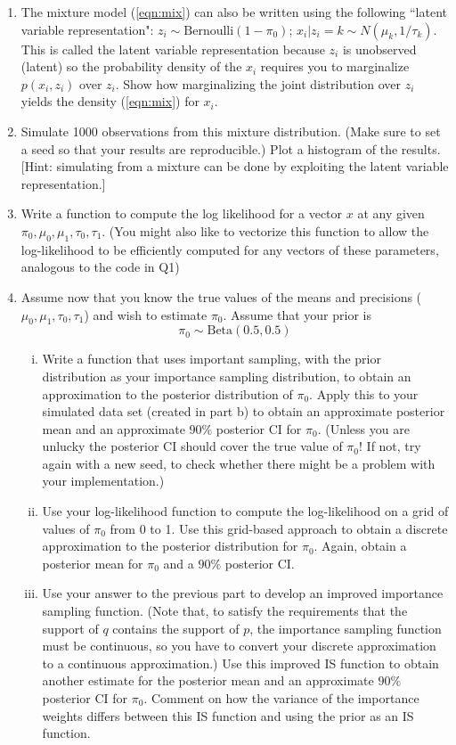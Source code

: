 \documentclass[12pt]{article}
\def\Be{\mbox{Beta}}
\begin{document}
\begin{enumerate}
\begin{enumerate}
\item The mixture model (\ref{eqn:mix}) can also be written using the following ``latent variable representation":
$z_i \sim \text{Bernoulli}(1-\pi_0)$; $x_i | z_i =k \sim N(\mu_k, 1/\tau_k)$.
This is called the latent variable representation because $z_i$ is unobserved (latent) so
the probability density of the $x_i$ requires you to marginalize $p(x_i,z_i)$ over $z_i$.
Show how marginalizing the joint distribution over $z_i$ yields the 
density (\ref{eqn:mix}) for $x_i$.
\item Simulate 1000 observations from this mixture distribution.  (Make sure to set a seed so that your
results are reproducible.) Plot a histogram of the results. [Hint: simulating from a mixture 
can be done by exploiting the latent variable representation.]
\item Write a function to compute the log likelihood for a vector $x$ at any given $\pi_0,\mu_0,\mu_1,\tau_0,\tau_1$.
(You might also like to vectorize this function to allow the log-likelihood to be efficiently 
computed for any vectors of these parameters, analogous to the code in Q1)
\item Assume now that you know the true values of the means and precisions ($\mu_0,\mu_1,\tau_0,\tau_1$) and
wish to estimate $\pi_0$.
Assume that your prior is
\begin{equation}
\pi_0 \sim \Be(0.5,0.5)
\end{equation}
\begin{enumerate}[i)]
\item Write a function that uses important sampling, with the prior distribution as your importance sampling
distribution, to obtain an approximation to the posterior distribution of $\pi_0$. Apply this to your simulated data set (created in part b) to obtain an approximate
posterior mean and an approximate $90\%$ posterior CI for $\pi_0$. (Unless you are unlucky the posterior CI should cover the true value of $\pi_0$! If not, try again with a new seed, to check
whether there might be a problem with your implementation.)
\item Use your log-likelihood function to compute the
log-likelihood on a grid of values of $\pi_0$ from 0 to 1. Use this grid-based approach to obtain a discrete approximation to the
posterior distribution for $\pi_0$. Again, obtain a posterior mean for $\pi_0$ and a $90\%$ posterior CI. 

\item Use your answer to the previous part to develop an improved importance sampling function. (Note that, to satisfy the requirements
that the support of $q$ contains the support of $p$, the importance sampling
function must be continuous, so you have to convert your discrete approximation to a continuous approximation.) Use this
improved IS function to obtain another estimate for the posterior mean and an approximate $90\%$ posterior CI for $\pi_0$.
Comment on how the variance of the importance weights differs between this IS function and using the prior as an IS function.
\end{enumerate}
\end{enumerate}


\end{enumerate}
\end{document}
